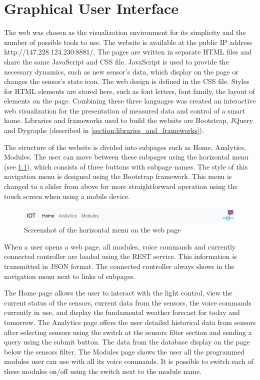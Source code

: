 \chapter{Graphical User Interface} \label{chap:GUI}

The web was chosen as the visualization environment for its simplicity and the number of possible tools to use. The website is available at the public IP address http://147.228.124.230:8881/. The pages are written in separate HTML files and share the same JavaScript and CSS file. JavaScript is used to provide the necessary dynamics, such as new sensor's data, which display on the page or changes the sensor's state icon. The web design is defined in the CSS file. Styles for HTML elements are stored here, such as font letters, font family, the layout of elements on the page. Combining these three languages was created an interactive web visualization for the presentation of measured data and control of a smart home. Libraries and frameworks used to build the website are Bootstrap, JQuery and Dygraphs (described in \cref{section:libraries_and_frameworks}).

The structure of the website is divided into subpages such as Home, Analytics, Modules. The user can move between these subpages using the horizontal menu (see \cref{fig:screenshot_menu}), which consists of three buttons with subpage names. The style of this navigation menu is designed using the Bootstrap framework. This menu is changed to a slider from above for more straightforward operation using the touch screen when using a mobile device.

\begin{figure}[H]
    \centering
    \includegraphics[width=\textwidth]{img/screenshot_menu.png}
    \caption{Screenshot of the horizontal menu on the web page}
    \label{fig:screenshot_menu}
\end{figure}

When a user opens a web page, all modules, voice commands and currently connected controller are loaded using the REST service. This information is transmitted in JSON format. The connected controller always shows in the navigation menu next to links of subpages.

The Home page allows the user to interact with the light control, view the current status of the sensors, current data from the sensors, the voice commands currently in use, and display the fundamental weather forecast for today and tomorrow. The Analytics page offers the user detailed historical data from sensors after selecting sensors using the switch at the sensors filter section and sending a query using the submit button. The data from the database display on the page below the sensors filter. The Modules page shows the user all the programmed modules user can use with all its voice commands. It is possible to switch each of these modules on/off using the switch next to the module name.

